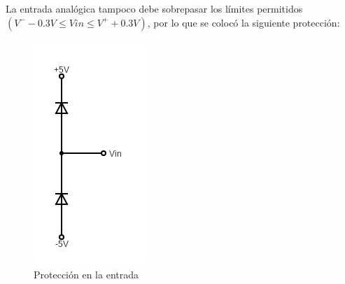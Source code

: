 \documentclass[assd_tp3_main.tex]{subfiles}
\begin{document}
La entrada analógica tampoco debe sobrepasar los límites permitidos
$(V^- - 0.3V \leq Vin \leq V^+ + 0.3V )$, por lo que se colocó la siguiente protección:

\begin{figure}[H]
	\centering
	\includegraphics[width=0.2 \textwidth]
	{images/ej1/proteccion in.png}
	\caption{Protección en la entrada}
	\label{fig:pin}
\end{figure}
\end{document}
